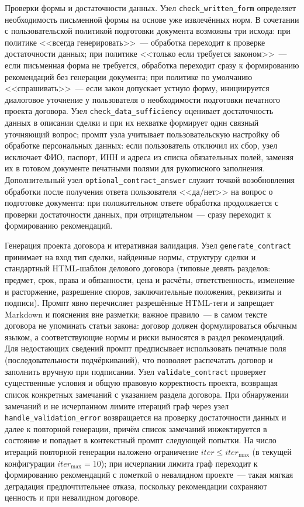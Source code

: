 Проверки формы и достаточности данных. Узел \texttt{check\_written\_form} определяет необходимость письменной формы на основе уже извлечённых норм. В сочетании с пользовательской политикой подготовки документа возможны три исхода: при политике <<всегда генерировать>>~--- обработка переходит к проверке достаточности данных; при политике <<только если требуется законом>>~--- если письменная форма не требуется, обработка переходит сразу к формированию рекомендаций без генерации документа; при политике по умолчанию <<спрашивать>>~--- если закон допускает устную форму, инициируется диалоговое уточнение у пользователя о необходимости подготовки печатного проекта договора. Узел \texttt{check\_data\_sufficiency} оценивает достаточность данных в описании сделки и при их нехватке формирует один связный уточняющий вопрос; промпт узла учитывает пользовательскую настройку об обработке персональных данных: если пользователь отключил их сбор, узел исключает ФИО, паспорт, ИНН и адреса из списка обязательных полей, заменяя их в готовом документе печатными полями для рукописного заполнения. Дополнительный узел \texttt{optional\_contract\_answer} служит точкой возобновления обработки после получения ответа пользователя <<да/нет>> на вопрос о подготовке документа: при положительном ответе обработка продолжается с проверки достаточности данных, при отрицательном~--- сразу переходит к формированию рекомендаций.

Генерация проекта договора и итеративная валидация. Узел \texttt{generate\_contract} принимает на вход тип сделки, найденные нормы, структуру сделки и стандартный HTML-шаблон делового договора (типовые девять разделов: предмет, срок, права и обязанности, цена и расчёты, ответственность, изменение и расторжение, разрешение споров, заключительные положения, реквизиты и подписи). Промпт явно перечисляет разрешённые HTML-теги и запрещает Markdown и пояснения вне разметки; важное правило~--- в самом тексте договора не упоминать статьи закона: договор должен формулироваться обычным языком, а соответствующие нормы и риски выносятся в раздел рекомендаций. Для недостающих сведений промпт предписывает использовать печатные поля (последовательности подчёркиваний), что позволяет распечатать договор и заполнить вручную при подписании. Узел \texttt{validate\_contract} проверяет существенные условия и общую правовую корректность проекта, возвращая список конкретных замечаний с указанием раздела договора. При обнаружении замечаний и не исчерпанном лимите итераций граф через узел \texttt{handle\_validation\_error} возвращается на проверку достаточности данных и далее к повторной генерации, причём список замечаний инжектируется в состояние и попадает в контекстный промпт следующей попытки. На число итераций повторной генерации наложено ограничение $\mathit{iter} \le \mathit{iter}_{\max}$ (в текущей конфигурации $\mathit{iter}_{\max}=10$); при исчерпании лимита граф переходит к формированию рекомендаций с пометкой о невалидном проекте~--- такая мягкая деградация предпочтительнее отказа, поскольку рекомендации сохраняют ценность и при невалидном договоре.

